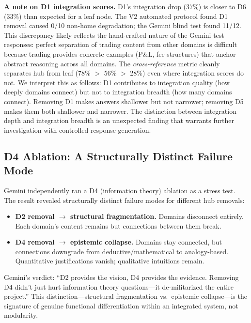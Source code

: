 \documentclass[12pt,letterpaper]{article}
\begin{document}
\textbf{A note on D1 integration scores.} D1's integration drop (37\%) is closer to D6 (33\%) than expected for a leaf node. The V2 automated protocol found D1 removal caused 0/10 non-home degradation; the Gemini blind test found 11/12. This discrepancy likely reflects the hand-crafted nature of the Gemini test responses: perfect separation of trading content from other domains is difficult because trading provides concrete examples (P\&L, fee structures) that anchor abstract reasoning across all domains. The \emph{cross-reference} metric cleanly separates hub from leaf (78\% $>$ 56\% $>$ 28\%) even where integration scores do not. We interpret this as follows: D1 contributes to integration quality (how deeply domains connect) but not to integration breadth (how many domains connect). Removing D1 makes answers shallower but not narrower; removing D5 makes them both shallower and narrower. The distinction between integration depth and integration breadth is an unexpected finding that warrants further investigation with controlled response generation.

\subsection{D4 Ablation: A Structurally Distinct Failure Mode}
\label{sec:v1-d4}

Gemini independently ran a D4 (information theory) ablation as a stress test. The result revealed structurally distinct failure modes for different hub removals:

\begin{itemize}[nosep]
  \item \textbf{D2 removal $\to$ structural fragmentation.} Domains disconnect entirely. Each domain's content remains but connections between them break.
  \item \textbf{D4 removal $\to$ epistemic collapse.} Domains stay connected, but connections downgrade from deductive/mathematical to analogy-based. Quantitative justifications vanish; qualitative intuitions remain.
\end{itemize}

Gemini's verdict: ``D2 provides the vision, D4 provides the evidence. Removing D4 didn't just hurt information theory questions---it de-militarized the entire project.'' This distinction---structural fragmentation vs.\ epistemic collapse---is the signature of genuine functional differentiation within an integrated system, not modularity.

\end{document}
